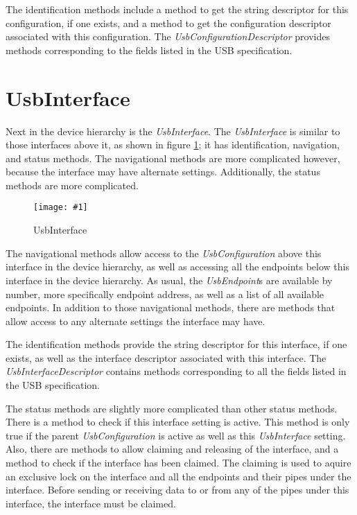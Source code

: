 \documentclass{article}
\newcommand{\myinterface}[1]{\emph{#1}}
\newcommand{\mysectionend}[0]{\vfill\pagebreak[1]}
\newcommand{\myfigure}[3]{\begin{figure}[htbp]\centering\texttt{[image: \#1]}\caption{#2}\label{#3}\end{figure}}
\begin{document}
The identification methods include a method to get the string
descriptor for this configuration, if one exists, and a method to get
the configuration descriptor associated with this configuration.  The
\myinterface{UsbConfigurationDescriptor} provides methods corresponding to the fields
listed in the USB specification.

\mysectionend

%

\section{UsbInterface}

Next in the device hierarchy is the \myinterface{UsbInterface}.  The \myinterface{UsbInterface} is
similar to those interfaces above it, as shown in figure \ref{UsbInterface};
it has identification, navigation, and status methods.  The navigational
methods are more complicated however, because the interface may have
alternate settings.  Additionally, the status methods are more complicated.

\myfigure{figs/UsbInterface}{UsbInterface}{UsbInterface}

The navigational methods allow access to the \myinterface{UsbConfiguration} above this
interface in the device hierarchy, as well as accessing all the
endpoints below this interface in the device hierarchy.  As usual, the
\myinterface{UsbEndpoint}s are available by number, more specifically endpoint address,
as well as a list of all available endpoints.  In addition to those
navigational methods, there are methods that allow access to any alternate
settings the interface may have.

The identification methods provide the string descriptor for this interface,
if one exists, as well as the interface descriptor associated with this interface.
The \myinterface{UsbInterfaceDescriptor} contains methods corresponding to all the fields
listed in the USB specification.

The status methods are slightly more complicated than other status methods.
There is a method to check if this interface setting is active.  This
method is only true if the parent \myinterface{UsbConfiguration} is active as well as
this \myinterface{UsbInterface} setting.  Also, there are methods to allow claiming
and releasing of the interface, and a method to check if the interface
has been claimed.  The claiming is used to aquire an exclusive lock
on the interface and all the endpoints and their pipes under the interface.
Before sending or receiving data to or from any of the pipes under
this interface, the interface must be claimed.
\end{document}
